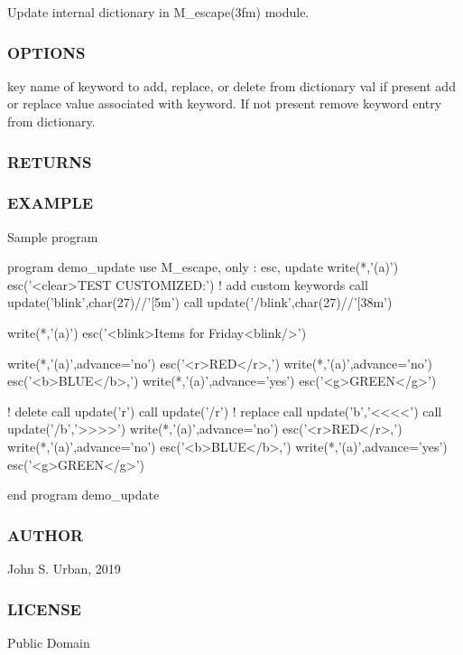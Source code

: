 Update internal dictionary in M\+\_\+escape(3fm) module. \subsubsection*{O\+P\+T\+I\+O\+NS}

key name of keyword to add, replace, or delete from dictionary val if present add or replace value associated with keyword. If not present remove keyword entry from dictionary. \subsubsection*{R\+E\+T\+U\+R\+NS}

\subsubsection*{E\+X\+A\+M\+P\+LE}

Sample program \begin{DoxyVerb}    program demo_update
    use M_escape, only : esc, update
       write(*,'(a)') esc('<clear>TEST CUSTOMIZED:')
       ! add custom keywords
       call update('blink',char(27)//'[5m')
       call update('/blink',char(27)//'[38m')

       write(*,'(a)') esc('<blink>Items for Friday<blink/>')

       write(*,'(a)',advance='no') esc('<r>RED</r>,')
       write(*,'(a)',advance='no') esc('<b>BLUE</b>,')
       write(*,'(a)',advance='yes') esc('<g>GREEN</g>')

       ! delete
       call update('r')
       call update('/r')
       ! replace
       call update('b','<<<<')
       call update('/b','>>>>')
       write(*,'(a)',advance='no') esc('<r>RED</r>,')
       write(*,'(a)',advance='no') esc('<b>BLUE</b>,')
       write(*,'(a)',advance='yes') esc('<g>GREEN</g>')

 end program demo_update
\end{DoxyVerb}


\subsubsection*{A\+U\+T\+H\+OR}

John S. Urban, 2019 \subsubsection*{L\+I\+C\+E\+N\+SE}

Public Domain 

